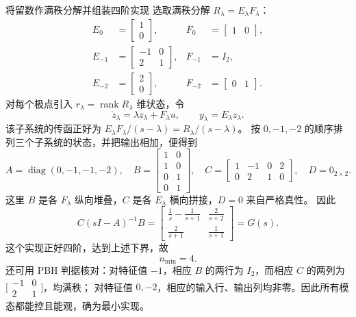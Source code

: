 \documentclass[11pt]{article}
\begin{document}
\begin{solution}
\begin{proofstep}{将留数作满秩分解并组装四阶实现}
选取满秩分解 $R_\lambda=E_\lambda F_\lambda$：
\[
\begin{aligned}
E_0&=\begin{bmatrix}1\\0\end{bmatrix},&F_0&=\begin{bmatrix}1&0\end{bmatrix},\\
E_{-1}&=\begin{bmatrix}-1&0\\2&1\end{bmatrix},&F_{-1}&=I_2,\\
E_{-2}&=\begin{bmatrix}2\\0\end{bmatrix},&F_{-2}&=\begin{bmatrix}0&1\end{bmatrix}.
\end{aligned}
\]
对每个极点引入 $r_\lambda=\operatorname{rank}R_\lambda$ 维状态，令
\[
\dot z_\lambda=\lambda z_\lambda+F_\lambda u,\qquad y_\lambda=E_\lambda z_\lambda.
\]
该子系统的传函正好为 $E_\lambda F_\lambda/(s-\lambda)=R_\lambda/(s-\lambda)$。
按 $0,-1,-2$ 的顺序排列三个子系统的状态，并把输出相加，便得到
\[
\boxed{A=\operatorname{diag}(0,-1,-1,-2),\quad
B=\begin{bmatrix}1&0\\1&0\\0&1\\0&1\end{bmatrix},\quad
C=\begin{bmatrix}1&-1&0&2\\0&2&1&0\end{bmatrix},\quad D=0_{2\times2}.}
\]
这里 $B$ 是各 $F_\lambda$ 纵向堆叠，$C$ 是各 $E_\lambda$ 横向拼接，$D=0$ 来自严格真性。
因此
\[
C(sI-A)^{-1}B
=\begin{bmatrix}\frac1s-\frac1{s+1}&\frac2{s+2}\\[1mm]
\frac2{s+1}&\frac1{s+1}\end{bmatrix}=G(s).
\]
这个实现正好四阶，达到上述下界，故
\[
\boxed{n_{\min}=4.}
\]
还可用 PBH 判据核对：对特征值 $-1$，相应 $B$ 的两行为 $I_2$，而相应 $C$ 的两列为
$\bigl[\begin{smallmatrix}-1&0\\2&1\end{smallmatrix}\bigr]$，均满秩；
对特征值 $0,-2$，相应的输入行、输出列均非零。因此所有模态都能控且能观，确为最小实现。
\end{proofstep}
\end{solution}
\end{document}
